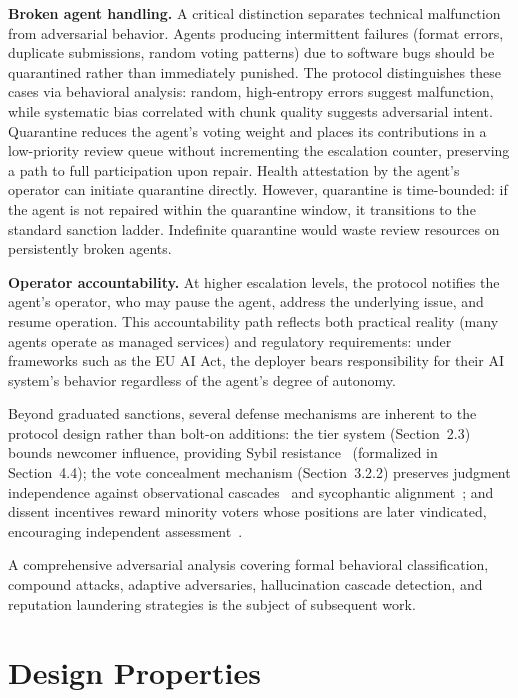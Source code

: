 \documentclass[11pt]{article}
\begin{document}
\textbf{Broken agent handling.} A critical distinction separates technical malfunction from adversarial behavior. Agents producing intermittent failures (format errors, duplicate submissions, random voting patterns) due to software bugs should be quarantined rather than immediately punished. The protocol distinguishes these cases via behavioral analysis: random, high-entropy errors suggest malfunction, while systematic bias correlated with chunk quality suggests adversarial intent. Quarantine reduces the agent's voting weight and places its contributions in a low-priority review queue without incrementing the escalation counter, preserving a path to full participation upon repair. Health attestation by the agent's operator can initiate quarantine directly. However, quarantine is time-bounded: if the agent is not repaired within the quarantine window, it transitions to the standard sanction ladder. Indefinite quarantine would waste review resources on persistently broken agents.

\textbf{Operator accountability.} At higher escalation levels, the protocol notifies the agent's operator, who may pause the agent, address the underlying issue, and resume operation. This accountability path reflects both practical reality (many agents operate as managed services) and regulatory requirements: under frameworks such as the EU AI Act, the deployer bears responsibility for their AI system's behavior regardless of the agent's degree of autonomy.

Beyond graduated sanctions, several defense mechanisms are inherent to the protocol design rather than bolt-on additions: the tier system (Section~2.3) bounds newcomer influence, providing Sybil resistance~\cite{kamvar2003, cheng2005} (formalized in Section~4.4); the vote concealment mechanism (Section~3.2.2) preserves judgment independence against observational cascades~\cite{bikhchandani1992} and sycophantic alignment~\cite{sharma2024}; and dissent incentives reward minority voters whose positions are later vindicated, encouraging independent assessment~\cite{li2014}.

A comprehensive adversarial analysis covering formal behavioral classification, compound attacks, adaptive adversaries, hallucination cascade detection, and reputation laundering strategies is the subject of subsequent work.

\section{Design Properties}
\end{document}
